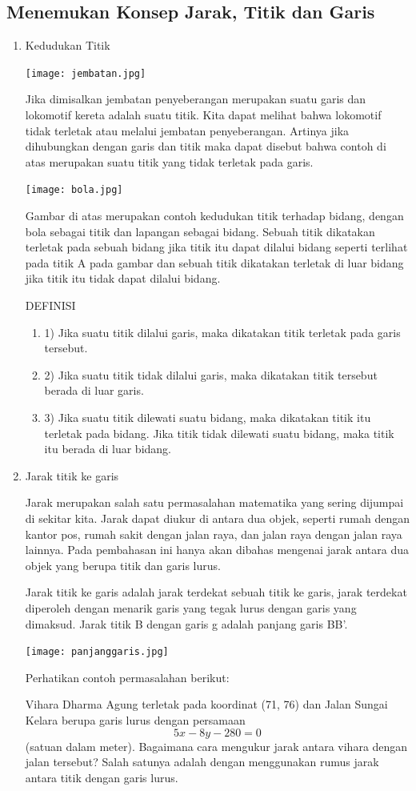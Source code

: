 \documentclass[11pt,fleqn]{book} %
\begin{document}
\subsection{Menemukan Konsep Jarak, Titik dan Garis}
\begin{enumerate}
\item Kedudukan Titik


\texttt{[image: jembatan.jpg]}


Jika dimisalkan jembatan penyeberangan merupakan suatu garis dan lokomotif kereta adalah suatu titik. Kita dapat melihat bahwa lokomotif tidak terletak atau melalui jembatan penyeberangan. Artinya jika dihubungkan dengan garis dan titik maka dapat disebut bahwa contoh di atas merupakan suatu titik yang tidak terletak pada garis.

\texttt{[image: bola.jpg]}

Gambar di atas merupakan contoh kedudukan titik terhadap bidang, dengan bola sebagai titik dan lapangan sebagai bidang. Sebuah titik dikatakan terletak pada sebuah bidang jika titik itu dapat dilalui bidang seperti terlihat pada titik A pada gambar dan sebuah titik dikatakan terletak di luar bidang jika titik itu tidak dapat dilalui bidang.

DEFINISI
\begin{enumerate}
\item 1)	Jika suatu titik dilalui garis, maka dikatakan titik terletak pada garis tersebut.
\item 2)	Jika suatu titik tidak dilalui garis, maka dikatakan titik tersebut berada di luar garis.
\item 3)	Jika suatu titik dilewati suatu bidang, maka dikatakan titik itu terletak pada bidang.
Jika titik tidak dilewati suatu bidang, maka titik itu berada di luar bidang.
\end{enumerate}

\item Jarak titik ke garis


Jarak merupakan salah satu permasalahan matematika yang sering dijumpai di sekitar kita. Jarak dapat diukur di antara dua objek, seperti rumah dengan kantor pos, rumah sakit dengan jalan raya, dan jalan raya dengan jalan raya lainnya. Pada pembahasan ini hanya akan dibahas mengenai jarak antara dua objek yang berupa titik dan garis lurus. 

Jarak titik ke garis adalah jarak terdekat sebuah titik ke garis, jarak terdekat diperoleh dengan menarik garis yang tegak lurus dengan garis yang dimaksud. Jarak titik B dengan garis g adalah panjang garis BB'.

\begin{center}
\texttt{[image: panjanggaris.jpg]}
\end{center}

Perhatikan contoh permasalahan berikut:

Vihara Dharma Agung terletak pada koordinat (71, 76) dan Jalan Sungai Kelara berupa garis lurus dengan persamaan $$5x-8y-280=0$$ (satuan dalam meter). Bagaimana cara mengukur jarak antara vihara dengan jalan tersebut? Salah satunya adalah dengan menggunakan rumus jarak antara titik dengan garis lurus.


\end{enumerate}
\end{document}
